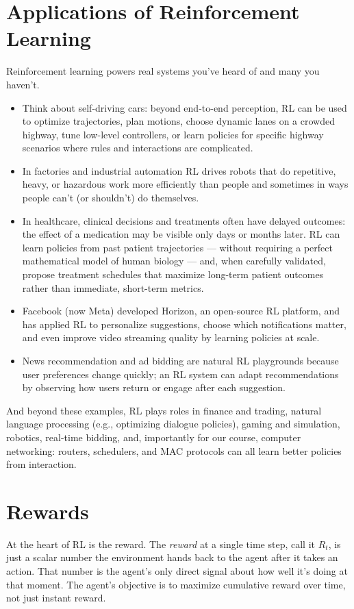 \section{Applications of Reinforcement Learning}
Reinforcement learning powers real systems you’ve heard of and many you haven’t. 
\begin{itemize}
    \item Think about self-driving cars: beyond end-to-end perception, RL can be used to optimize trajectories, plan motions, choose dynamic lanes on a crowded highway, tune low-level controllers, or learn policies for specific highway scenarios where rules and interactions are complicated. 
    \item In factories and industrial automation RL drives robots that do repetitive, heavy, or hazardous work more efficiently than people and sometimes in ways people can’t (or shouldn’t) do themselves.
    \item In healthcare, clinical decisions and treatments often have delayed outcomes: the effect of a medication may be visible only days or months later. RL can learn policies from past patient trajectories — without requiring a perfect mathematical model of human biology — and, when carefully validated, propose treatment schedules that maximize long-term patient outcomes rather than immediate, short-term metrics.
    \item Facebook (now Meta) developed Horizon, an open-source RL platform, and has applied RL to personalize suggestions, choose which notifications matter, and even improve video streaming quality by learning policies at scale. 
    \item News recommendation and ad bidding are natural RL playgrounds because user preferences change quickly; an RL system can adapt recommendations by observing how users return or engage after each suggestion. 
\end{itemize}
And beyond these examples, RL plays roles in finance and trading, natural language processing (e.g., optimizing dialogue policies), gaming and simulation, robotics, real-time bidding, and, importantly for our course, computer networking: routers, schedulers, and MAC protocols can all learn better policies from interaction.

\section{Rewards}
At the heart of RL is the reward. The \textit{reward} at a single time step, call it $R_t$, is just a scalar number the environment hands back to the agent after it takes an action. That number is the agent’s only direct signal about how well it’s doing at that moment. The agent’s objective is to maximize cumulative reward over time, not just instant reward.

